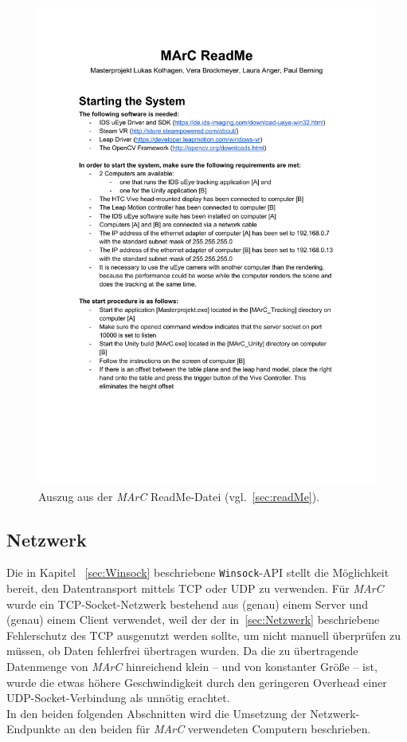 \begin{figure}
	\centering
	\includegraphics[page=1, trim=1cm 12.25cm 1cm 5.25cm, clip, width=\textwidth]{kapitel/anhang/ReadMe.pdf} 
	\caption[Auszug aus der \emph{MArC} ReadMe-Datei]{Auszug aus der \emph{MArC} ReadMe-Datei (vgl.~\ref{sec:readMe}).}
	\label{fig:marcReadMe}
\end{figure}

\subsection{Netzwerk}\label{sec:netzwerk}%
Die in Kapitel ~\ref{sec:Winsock} beschriebene  \texttt{Winsock}-API stellt die Möglichkeit bereit, den Datentransport mittels TCP oder UDP zu verwenden. Für \emph{MArC} wurde ein TCP-Socket-Netzwerk bestehend aus (genau) einem Server und (genau) einem Client verwendet, weil der der in~\ref{sec:Netzwerk} beschriebene Fehlerschutz des TCP ausgenutzt werden sollte, um nicht manuell überprüfen zu müssen, ob Daten fehlerfrei übertragen wurden. Da die zu übertragende Datenmenge von \emph{MArC} hinreichend klein -- und von konstanter Größe -- ist, wurde die etwas höhere Geschwindigkeit durch den geringeren Overhead einer UDP-Socket-Verbindung als unnötig erachtet.\\
In den beiden folgenden Abschnitten wird die Umsetzung der Netzwerk-Endpunkte an den beiden für \emph{MArC} verwendeten Computern beschrieben.
